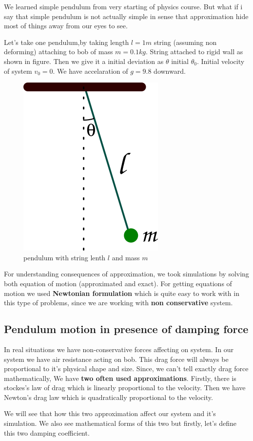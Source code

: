 \documentclass[11pt,a4paper]{article}
\begin{document}
We learned simple pendulum from very starting of physics course. But what if i say that simple pendulum is not actually simple in sense that approximation hide most of things away from our eyes to see.

Let's take one pendulum,by taking length \(l = 1 m\) string (assuming non deforming) attaching to bob of mass \(m = 0.1 kg\). String attached to rigid wall as shown in figure. Then we give it a initial deviation as \(\theta\) initial \(\theta_{0}\). Initial velocity of system \(v_{0}=0\). We have accelaration of \(g=9.8\) downward.

\begin{figure}[htbp]
\centering
\includegraphics[width=0.3 \textwidth]{./figure1.png}
\caption{\label{fig:org673929b}pendulum with string lenth \(l\) and mass \(m\)}
\end{figure}

For understanding consequences of approximation, we took simulations by solving both equation of motion (approximated and exact). For getting equations of motion we used \textbf{Newtonian formulation} which is quite easy to work with in this type of problems, since we are working with \textbf{non conservative} system.


\subsection{Pendulum motion in presence of damping force}
\label{sec:org38c3a8a}

In real situations we have non-conservative forces affecting on system. In our system we have air resistance acting on bob. This drag force will always be proportional to it's physical shape and size. Since, we can't tell exactly drag force mathematically, We have \textbf{two often used approximations}. Firstly, there is stockes's law of drag which is linearly proportional to the velocity. Then we have Newton's drag law which is quadratically proportional to the velocity.

We will see that how this two approximation affect our system and it's simulation. We also see mathematical forms of this two but firstly, let's define this two damping coefficient.
\end{document}
